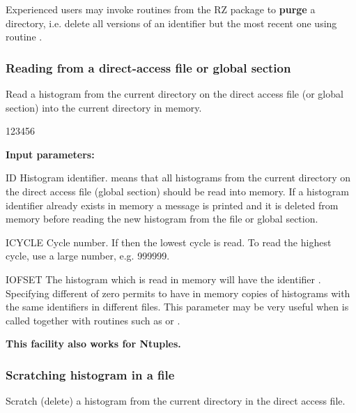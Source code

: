 Experienced users may invoke routines
from the \ZEBRA{} RZ package to {\bf purge}
a directory, i.e.
delete all versions of an identifier but the most recent one
using routine .

\newpage%
 
\subsubsection*{\label{HREADDAF}Reading from a direct-access file or global section}
 
 
\Action
Read a histogram from the
current directory on the direct access file (or global section)
into the current directory in memory.
 
\begin{DLtt}{123456}
\item[{\rm\bf Input parameters:}]
\item[ID]
Histogram identifier.
 means that all histograms from the current directory on
the direct access file (global section) should be read into memory.
If a histogram identifier  already exists in
memory
a message is printed and it is deleted from memory before reading
the new histogram from the file or global section.
\item[ICYCLE]
Cycle number. If  then the lowest cycle is read.
To read the highest cycle, use a large number, e.g. 999999.
\item[IOFSET]
The histogram which is read in memory will have the identifier
.
Specifying  different of zero permits to have in memory
copies of histograms with the same identifiers 
in different files. This parameter may be very useful when 
is called together with routines such as  or .
\begin{changebar}
\textbf{This facility also works for Ntuples.}
\end{changebar}
\end{DLtt}
 
\subsubsection*{\label{HSCRATCH}Scratching histogram in a file}
 
 
\Action
Scratch (delete) a histogram from the current directory in the direct
access file.
 
